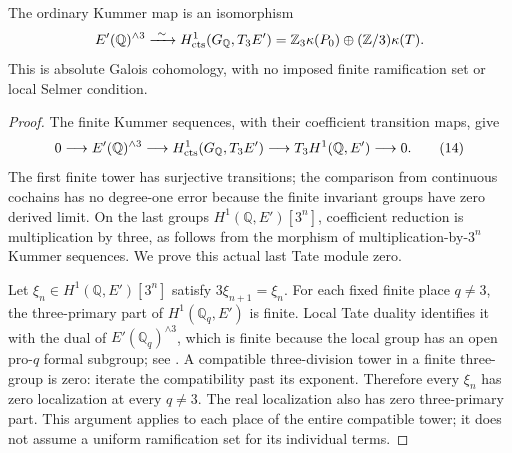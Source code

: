 \begin{proposition}
\label{prop:ghost-elliptic-h1}
The ordinary Kummer map is an isomorphism
\[
 E'(\mathbb Q)^{\wedge3}
       \xrightarrow{\ \sim\ }
 H^1_{\rm cts}(G_{\mathbb Q},T_3E')
       =\mathbb Z_3\kappa(P_0)
          \oplus(\mathbb Z/3)\kappa(T).
\]
This is absolute Galois cohomology, with no imposed
finite ramification set or local Selmer condition.
\end{proposition}
\begin{proof}
The finite Kummer sequences, with their coefficient
transition maps, give
\[
 0\longrightarrow E'(\mathbb Q)^{\wedge3}
 \longrightarrow H^1_{\rm cts}(G_{\mathbb Q},T_3E')
 \longrightarrow T_3H^1(\mathbb Q,E')
 \longrightarrow0.                                   \tag{14}
\]
The first finite tower has surjective transitions;
the comparison from continuous cochains has no
degree-one error because the finite invariant
groups have zero derived limit. On the last
groups \(H^1(\mathbb Q,E')[3^n]\), coefficient
reduction is multiplication by three, as follows
from the morphism of multiplication-by-\(3^n\)
Kummer sequences. We prove this actual last Tate
module zero.

Let \(\xi_n\in H^1(\mathbb Q,E')[3^n]\) satisfy
\(3\xi_{n+1}=\xi_n\). For each fixed finite
place \(q\ne3\), the three-primary part of
\(H^1(\mathbb Q_q,E')\) is finite. Local Tate
duality identifies it with the dual of
\(E'(\mathbb Q_q)^{\wedge3}\), which is finite
because the local group has an open pro-\(q\)
formal subgroup; see
\cite[I.3.3--3.5]{GhostMilneADT}.
A compatible three-division tower in a finite
three-group is zero: iterate the compatibility
past its exponent. Therefore every \(\xi_n\)
has zero localization at every \(q\ne3\).
The real localization also has zero three-primary
part. This argument applies to each place of the
entire compatible tower; it does not assume a
uniform ramification set for its individual terms.


\end{proof}
